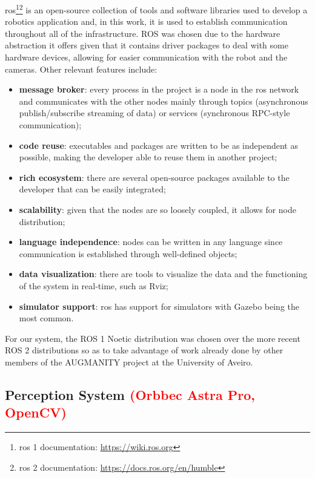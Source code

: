 \acs{ros}\cite{ROS2}\footnote{\acs{ros} 1 documentation: \url{https://wiki.ros.org}}\footnote{\acs{ros} 2 documentation: \url{https://docs.ros.org/en/humble}} is an open-source collection of tools and software libraries used to develop a robotics application and, in this work, it is used to establish communication throughout all of the infrastructure. ROS was chosen due to the hardware abstraction it offers given that it contains driver packages to deal with some hardware devices, allowing for easier communication with the robot and the cameras.
Other relevant features include:
\begin{itemize}
    \item \textbf{message broker}: every process in the project is a node in the \acs{ros} network and communicates with the other nodes mainly through topics (asynchronous publish/subscribe streaming of data) or services (synchronous RPC-style communication);
    \item \textbf{code reuse}: executables and packages are written to be as independent as possible, making the developer able to reuse them in another project;
    \item \textbf{rich ecosystem}: there are several open-source packages available to the developer that can be easily integrated;
    \item \textbf{scalability}: given that the nodes are so loosely coupled, it allows for node distribution;
    \item \textbf{language independence}: nodes can be written in any language since communication is established through well-defined objects;
    \item \textbf{data visualization}: there are tools to visualize the data and the functioning of the system in real-time, such as Rviz;
    \item \textbf{simulator support}: \acs{ros} has support for simulators with Gazebo being the most common.
\end{itemize}

For our system, the ROS 1 Noetic distribution was chosen over the more recent ROS 2 distributions so as to take advantage of work already done by other members of the AUGMANITY project at the University of Aveiro.

\subsection{Perception System \textcolor{red}{(Orbbec Astra Pro, OpenCV)}}
\label{subsection:perception_system}


